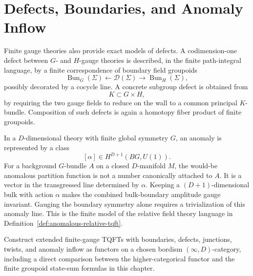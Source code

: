 \section{Defects, Boundaries, and Anomaly Inflow}

Finite gauge theories also provide exact models of defects.  A
codimension-one defect between \(G\)- and \(H\)-gauge theories is described,
in the finite path-integral language, by a finite correspondence of boundary
field groupoids
\begin{equation}
  \operatorname{Bun}_G(\Sigma)
  \xleftarrow{\ }
  \mathcal D(\Sigma)
  \xrightarrow{\ }
  \operatorname{Bun}_H(\Sigma),
  \label{eq:finite-gauge-defect-correspondence}
\end{equation}
possibly decorated by a cocycle line.  A concrete subgroup defect is obtained
from
\[
  K\subset G\times H,
\]
by requiring the two gauge fields to reduce on the wall to a common
principal \(K\)-bundle.  Composition of such defects is again a homotopy
fiber product of finite groupoids.

In a \(D\)-dimensional theory with finite global symmetry \(G\), an anomaly
is represented by a class
\[
  [\alpha]\in H^{D+1}(BG,U(1)).
\]
For a background \(G\)-bundle \(A\) on a closed \(D\)-manifold \(M\), the
would-be anomalous partition function is not a number canonically attached
to \(A\).  It is a vector in the transgressed line determined by \(\alpha\).
Keeping a \((D+1)\)-dimensional bulk with action \(\alpha\) makes the
combined bulk-boundary amplitude gauge invariant.  Gauging the boundary
symmetry alone requires a trivialization of this anomaly line.  This is the
finite model of the relative field theory language in
Definition~\ref{def:anomalous-relative-tqft}.

\begin{openproblem}
\label{op:extended-finite-models}
Construct extended finite-gauge TQFTs with boundaries, defects, junctions,
twists, and anomaly inflow as functors on a chosen bordism
\((\infty,D)\)-category, including a direct comparison between the
higher-categorical functor and the finite groupoid state-sum formulas in
this chapter.
\end{openproblem}
